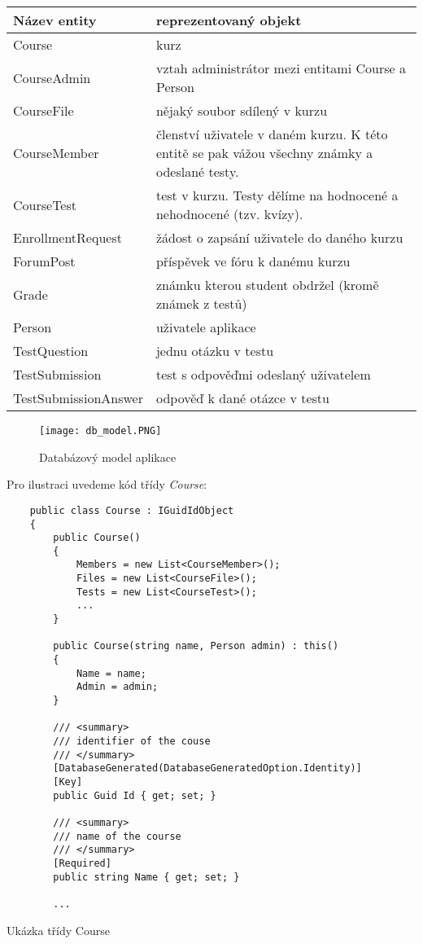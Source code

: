 \begin{table}[ht]
	\centering
	\begin{tabular}{| l | p{9cm} |}
		\hline
		Název entity & reprezentovaný objekt \\
		\hline \hline
		Course & kurz \\ \hline
		CourseAdmin & vztah administrátor mezi entitami Course a Person \\ \hline		
		CourseFile & nějaký soubor sdílený v kurzu \\ \hline
		CourseMember & členství uživatele v daném kurzu. 
		K této entitě se pak vážou všechny známky a odeslané testy. \\ \hline
		CourseTest & test v kurzu. Testy dělíme na hodnocené a nehodnocené (tzv. kvízy). \\ \hline
		EnrollmentRequest & žádost o zapsání uživatele do daného kurzu \\ \hline
		ForumPost & příspěvek ve fóru k danému kurzu \\ \hline
		Grade & známku kterou student obdržel (kromě známek z testů) \\ \hline
		Person & uživatele aplikace \\ \hline
		TestQuestion & jednu otázku v testu \\ \hline
		TestSubmission & test s odpověďmi odeslaný uživatelem \\ \hline
		TestSubmissionAnswer & odpověď k dané otázce v testu \\
		\hline
	\end{tabular}
\end{table}

\newpage

\begin{figure}
	\centering
	\texttt{[image: db\_model.PNG]}
	\caption{Databázový model aplikace}
\end{figure}

\newpage

Pro ilustraci uvedeme kód třídy \textit{Course}:

\begin{program}
	\begin{lstlisting}
	public class Course : IGuidIdObject
	{
		public Course()
		{
			Members = new List<CourseMember>();
			Files = new List<CourseFile>();
			Tests = new List<CourseTest>();
			...
		}
		
		public Course(string name, Person admin) : this()
		{
			Name = name;
			Admin = admin;
		}
		
		/// <summary>
		/// identifier of the couse
		/// </summary>
		[DatabaseGenerated(DatabaseGeneratedOption.Identity)]
		[Key]
		public Guid Id { get; set; }
		
		/// <summary>
		/// name of the course
		/// </summary>
		[Required]
		public string Name { get; set; }
		
		...
	\end{lstlisting}
	\caption{Ukázka třídy Course}
\end{program}

